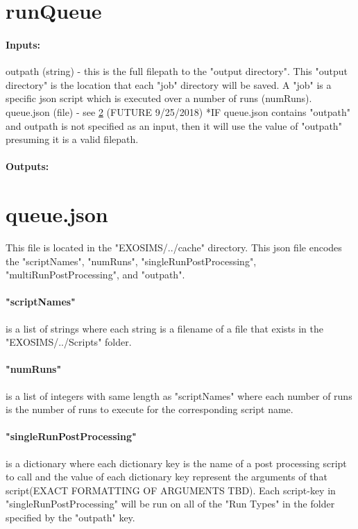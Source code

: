 \documentclass[12pt]{article}
\begin{document}


\section{runQueue}

\paragraph{Inputs:}
outpath (string) - this is the full filepath to the "output directory". This "output directory" is the location that each "job" directory will be saved. A "job" is a specific json script which is executed over a number of runs (numRuns).
queue.json (file) - see \ref{sec:queue.json} (FUTURE 9/25/2018) *IF queue.json contains "outpath" and outpath is not specified as an input, then it will use the value of "outpath" presuming it is a valid filepath.
\paragraph{Outputs:}


\section{queue.json}\label{sec:queue.json}
This file is located in the "EXOSIMS/../cache" directory.
This json file encodes the "scriptNames", "numRuns", "singleRunPostProcessing", "multiRunPostProcessing", and "outpath".
\paragraph{"scriptNames"} is a list of strings where each string is a filename of a file that exists in the "EXOSIMS/../Scripts" folder.
\paragraph{"numRuns"} is a list of integers with same length as "scriptNames" where each number of runs is the number of runs to execute for the corresponding script name.
\paragraph{"singleRunPostProcessing"} is a dictionary where each dictionary key is the name of a post processing script to call and the value of each dictionary key represent the arguments of that script(EXACT FORMATTING OF ARGUMENTS TBD).
Each script-key in "singleRunPostProcessing" will be run on all of the "Run Types" in the folder specified by the "outpath" key.
\end{document}
